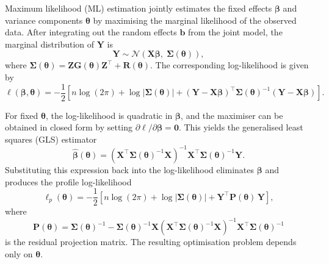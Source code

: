 \documentclass[
  letterpaper,
  DIV=11,
  numbers=noendperiod]{scrartcl}
\begin{document}
Maximum likelihood (ML) estimation jointly estimates the fixed effects
\(\symbf{\beta}\) and variance components \(\symbf{\theta}\) by
maximising the marginal likelihood of the observed data. After
integrating out the random effects \(\symbf{b}\) from the joint model,
the marginal distribution of \(\symbf{Y}\) is \begin{equation}
\symbf{Y} \sim \mathcal{N}\!\left(\symbf{X}\symbf{\beta},\; \symbf{\Sigma}(\symbf{\theta})\right),
\end{equation} where
\(\symbf{\Sigma}(\symbf{\theta}) = \symbf{Z}\symbf{G}(\symbf{\theta})\symbf{Z}^\top + \symbf{R}(\symbf{\theta})\).
The corresponding log-likelihood is given by \begin{equation}
\ell(\symbf{\beta}, \symbf{\theta})
=
-\frac{1}{2}\left[
n\log(2\pi)
+ \log\left|\symbf{\Sigma}(\symbf{\theta})\right|
+ (\symbf{Y} - \symbf{X}\symbf{\beta})^\top
\symbf{\Sigma}(\symbf{\theta})^{-1}
(\symbf{Y} - \symbf{X}\symbf{\beta})
\right].
\end{equation}

For fixed \(\symbf{\theta}\), the log-likelihood is quadratic in
\(\symbf{\beta}\), and the maximiser can be obtained in closed form by
setting \(\partial \ell / \partial \symbf{\beta} = \symbf{0}\). This
yields the generalised least squares (GLS) estimator \begin{equation}
\widehat{\symbf{\beta}}(\symbf{\theta})
=
\left(
\symbf{X}^\top \symbf{\Sigma}(\symbf{\theta})^{-1} \symbf{X}
\right)^{-1}
\symbf{X}^\top \symbf{\Sigma}(\symbf{\theta})^{-1} \symbf{Y}.
\end{equation} Substituting this expression back into the log-likelihood
eliminates \(\symbf{\beta}\) and produces the profile log-likelihood
\begin{equation}
\ell_p(\symbf{\theta})
=
-\frac{1}{2}\left[
n\log(2\pi)
+ \log\left|\symbf{\Sigma}(\symbf{\theta})\right|
+ \symbf{Y}^\top \symbf{P}(\symbf{\theta})\, \symbf{Y}
\right],
\end{equation} where \begin{equation}
\symbf{P}(\symbf{\theta})
=
\symbf{\Sigma}(\symbf{\theta})^{-1}
-
\symbf{\Sigma}(\symbf{\theta})^{-1}\symbf{X}
\left(
\symbf{X}^\top\symbf{\Sigma}(\symbf{\theta})^{-1}\symbf{X}
\right)^{-1}
\symbf{X}^\top\symbf{\Sigma}(\symbf{\theta})^{-1}
\end{equation} is the residual projection matrix. The resulting
optimisation problem depends only on \(\symbf{\theta}\).
\end{document}
